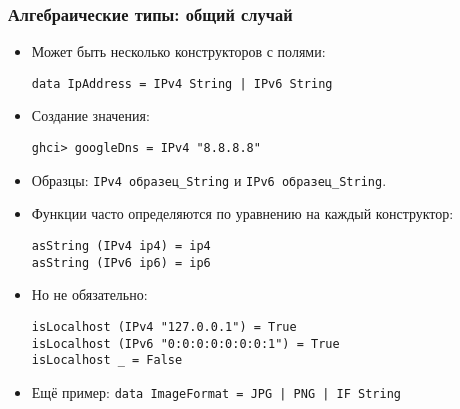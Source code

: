 \documentclass[10pt]{beamer}
\begin{document}
\begin{frame}[fragile]
  \frametitle{Алгебраические типы: общий случай}
  \begin{itemize}
    \item Может быть несколько конструкторов с полями:
          \begin{lstlisting}[basicstyle=\ttfamily\small]
data IpAddress = IPv4 String | IPv6 String
\end{lstlisting}
    \item Создание значения:
          \begin{lstlisting}[basicstyle=\ttfamily\small]
ghci> googleDns = IPv4 "8.8.8.8"
\end{lstlisting}
    \item Образцы: \lstinline[basicstyle=\ttfamily\small]|IPv4 образец_String| и \lstinline[basicstyle=\ttfamily\small]|IPv6 образец_String|.
    \item Функции часто определяются по уравнению на каждый конструктор:
          \begin{lstlisting}[basicstyle=\ttfamily\small]
asString (IPv4 ip4) = ip4
asString (IPv6 ip6) = ip6
\end{lstlisting}
          \pause
    \item Но не обязательно:
          \begin{lstlisting}[basicstyle=\ttfamily\small]
isLocalhost (IPv4 "127.0.0.1") = True
isLocalhost (IPv6 "0:0:0:0:0:0:0:1") = True
isLocalhost _ = False
\end{lstlisting}
          \pause
    \item Ещё пример: \lstinline[basicstyle=\ttfamily\small]!data ImageFormat = JPG | PNG | IF String!
  \end{itemize}
\end{frame}
\end{document}
